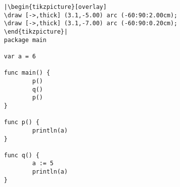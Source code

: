 \begin{lstlisting}[linewidth=.5\textwidth,caption=Local scope]
|\begin{tikzpicture}[overlay]
\draw [->,thick] (3.1,-5.00) arc (-60:90:2.00cm);
\draw [->,thick] (3.1,-7.00) arc (-60:90:0.20cm);
\end{tikzpicture}|
package main

var a = 6

func main() {
        p()
        q()
        p()
}

func p() {
        println(a)
}

func q() {
        a := 5
        println(a)
}
\end{lstlisting}
